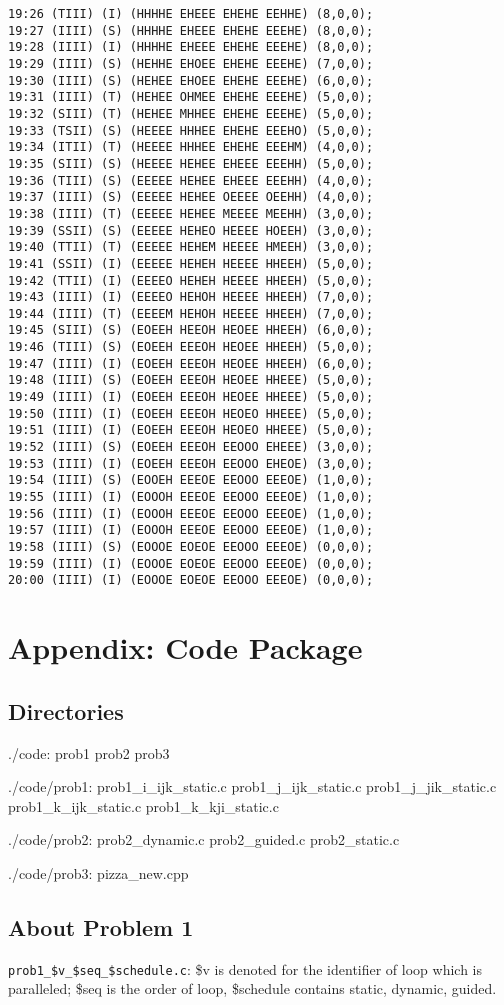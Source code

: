 \documentclass[a4paper]{article}   %
\begin{document}
\begin{CJK}{UTF8}{gbsn}
\begin{spacing}{1.2}
\begin{lstlisting}
19:26 (TIII) (I) (HHHHE EHEEE EHEHE EEHHE) (8,0,0);
19:27 (IIII) (S) (HHHHE EHEEE EHEHE EEEHE) (8,0,0);
19:28 (IIII) (I) (HHHHE EHEEE EHEHE EEEHE) (8,0,0);
19:29 (IIII) (S) (HEHHE EHOEE EHEHE EEEHE) (7,0,0);
19:30 (IIII) (S) (HEHEE EHOEE EHEHE EEEHE) (6,0,0);
19:31 (IIII) (T) (HEHEE OHMEE EHEHE EEEHE) (5,0,0);
19:32 (SIII) (T) (HEHEE MHHEE EHEHE EEEHE) (5,0,0);
19:33 (TSII) (S) (HEEEE HHHEE EHEHE EEEHO) (5,0,0);
19:34 (ITII) (T) (HEEEE HHHEE EHEHE EEEHM) (4,0,0);
19:35 (SIII) (S) (HEEEE HEHEE EHEEE EEEHH) (5,0,0);
19:36 (TIII) (S) (EEEEE HEHEE EHEEE EEEHH) (4,0,0);
19:37 (IIII) (S) (EEEEE HEHEE OEEEE OEEHH) (4,0,0);
19:38 (IIII) (T) (EEEEE HEHEE MEEEE MEEHH) (3,0,0);
19:39 (SSII) (S) (EEEEE HEHEO HEEEE HOEEH) (3,0,0);
19:40 (TTII) (T) (EEEEE HEHEM HEEEE HMEEH) (3,0,0);
19:41 (SSII) (I) (EEEEE HEHEH HEEEE HHEEH) (5,0,0);
19:42 (TTII) (I) (EEEEO HEHEH HEEEE HHEEH) (5,0,0);
19:43 (IIII) (I) (EEEEO HEHOH HEEEE HHEEH) (7,0,0);
19:44 (IIII) (T) (EEEEM HEHOH HEEEE HHEEH) (7,0,0);
19:45 (SIII) (S) (EOEEH HEEOH HEOEE HHEEH) (6,0,0);
19:46 (TIII) (S) (EOEEH EEEOH HEOEE HHEEH) (5,0,0);
19:47 (IIII) (I) (EOEEH EEEOH HEOEE HHEEH) (6,0,0);
19:48 (IIII) (S) (EOEEH EEEOH HEOEE HHEEE) (5,0,0);
19:49 (IIII) (I) (EOEEH EEEOH HEOEE HHEEE) (5,0,0);
19:50 (IIII) (I) (EOEEH EEEOH HEOEO HHEEE) (5,0,0);
19:51 (IIII) (I) (EOEEH EEEOH HEOEO HHEEE) (5,0,0);
19:52 (IIII) (S) (EOEEH EEEOH EEOOO EHEEE) (3,0,0);
19:53 (IIII) (I) (EOEEH EEEOH EEOOO EHEOE) (3,0,0);
19:54 (IIII) (S) (EOOEH EEEOE EEOOO EEEOE) (1,0,0);
19:55 (IIII) (I) (EOOOH EEEOE EEOOO EEEOE) (1,0,0);
19:56 (IIII) (I) (EOOOH EEEOE EEOOO EEEOE) (1,0,0);
19:57 (IIII) (I) (EOOOH EEEOE EEOOO EEEOE) (1,0,0);
19:58 (IIII) (S) (EOOOE EOEOE EEOOO EEEOE) (0,0,0);
19:59 (IIII) (I) (EOOOE EOEOE EEOOO EEEOE) (0,0,0);
20:00 (IIII) (I) (EOOOE EOEOE EEOOO EEEOE) (0,0,0);
\end{lstlisting}



\appendix
\section*{Appendix: Code Package}
\subsection{Directories}
./code:
prob1  prob2  prob3

./code/prob1:
prob1\_i\_ijk\_static.c  prob1\_j\_ijk\_static.c  prob1\_j\_jik\_static.c  prob1\_k\_ijk\_static.c  prob1\_k\_kji\_static.c

./code/prob2:
prob2\_dynamic.c  prob2\_guided.c  prob2\_static.c

./code/prob3:
pizza\_new.cpp

\subsection{About Problem 1}
\texttt{prob1\_\$v\_\$seq\_\$schedule.c}: \$v is denoted for the identifier of loop which is paralleled; \$seq is the order of loop, \$schedule contains static, dynamic, guided. 

\end{spacing}
\end{CJK}
\end{document}

